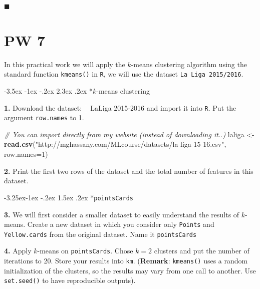 \documentclass[]{book}
\makeatletter
\newenvironment{Shaded}{\begin{snugshade}}{\end{snugshade}}
\newcommand{\KeywordTok}[1]{\textcolor[rgb]{0.13,0.29,0.53}{\textbf{#1}}}
\newcommand{\DataTypeTok}[1]{\textcolor[rgb]{0.13,0.29,0.53}{#1}}
\newcommand{\DecValTok}[1]{\textcolor[rgb]{0.00,0.00,0.81}{#1}}
\newcommand{\StringTok}[1]{\textcolor[rgb]{0.31,0.60,0.02}{#1}}
\newcommand{\CommentTok}[1]{\textcolor[rgb]{0.56,0.35,0.01}{\textit{#1}}}
\newcommand{\NormalTok}[1]{#1}
\renewcommand\section{\@startsection {section}{1}{\z@}%
                                   {-3.5ex \@plus -1ex \@minus -.2ex}%
                                   {2.3ex \@plus.2ex}%
                                   {\normalfont\Large\bfseries\color{ForestGreen}}}
\renewcommand\subsection{\@startsection{subsection}{2}{\z@}%
                                     {-3.25ex\@plus -1ex \@minus -.2ex}%
                                     {1.5ex \@plus .2ex}%
                                     {\normalfont\large\bfseries\color{Violet}}}
\theoremstyle{definition}
\theoremstyle{definition}
\theoremstyle{definition}
\theoremstyle{remark}
\makeatother
\begin{document}
◼

\chapter*{PW 7}\label{pw-7}

In this practical work we will apply the \(k\)-means clustering
algorithm using the standard function \texttt{kmeans()} in \texttt{R},
we will use the dataset \texttt{La\ Liga\ 2015/2016}.

\section*{\texorpdfstring{\(k\)-means
clustering}{k-means clustering}}\label{k-means-clustering}

\textbf{1.} Download the dataset:
\textcolor{white}{[}\faTable\textcolor{white}{]} LaLiga 2015-2016 and
import it into \texttt{R}. Put the argument \texttt{row.names} to 1.

\begin{Shaded}
\begin{Highlighting}[]
\CommentTok{# You can import directly from my website (instead of downloading it..)}
\NormalTok{laliga <-}\StringTok{ }\KeywordTok{read.csv}\NormalTok{(}\StringTok{"http://mghassany.com/MLcourse/datasets/la-liga-15-16.csv"}\NormalTok{, }\DataTypeTok{row.names=}\DecValTok{1}\NormalTok{)}
\end{Highlighting}
\end{Shaded}

\textbf{2.} Print the first two rows of the dataset and the total number
of features in this dataset.

\subsection*{\texorpdfstring{\texttt{pointsCards}}{pointsCards}}\label{pointscards}

\textbf{3.} We will first consider a smaller dataset to easily
understand the results of \(k\)-means. Create a new dataset in which you
consider only \texttt{Points} and \texttt{Yellow.cards} from the
original dataset. Name it \texttt{pointsCards}

\textbf{4.} Apply \(k\)-means on \texttt{pointsCards}. Chose \(k=2\)
clusters and put the number of iterations to 20. Store your results into
\texttt{km}. (\textbf{Remark}: \texttt{kmeans()} uses a random
initialization of the clusters, so the results may vary from one call to
another. Use \texttt{set.seed()} to have reproducible outputs).
\end{document}

